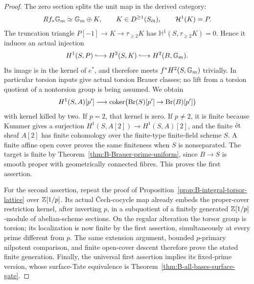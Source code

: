 \begin{proof}
The zero section splits the unit map in the derived category:
\[
       Rf_*{\mathbb G_m}\simeq{\mathbb G_m}\oplus K,
       \qquad K\in D^{\ge1}(S_{\mathrm{\acute et}}),
       \qquad\mathcal H^1(K)=P.
\]
The truncation triangle
\(P[-1]\to K\to\tau_{\ge2}K\) has
\(\mathbb H^1(S,\tau_{\ge2}K)=0\).  Hence it induces
an actual injection
\[
 H^1(S,P)\lhook\joinrel\longrightarrow
 H^2(S,K)\lhook\joinrel\longrightarrow H^2(B,\Gm).
\]
Its image is in the kernel of \(e^*\), and therefore meets
\(f^*H^2(S,{\mathbb G_m})\) trivially.  In particular torsion inputs
give actual torsion Brauer classes; no lift from a torsion
quotient of a nontorsion group is being assumed.  We obtain
\[
 H^1(S,A)[p']\longrightarrow
 \operatorname{coker}\bigl(\operatorname{Br}(S)[p']\to\operatorname{Br}(B)[p']\bigr)
\]
with kernel killed by two.  If \(p=2\), that kernel is zero.
If \(p\ne2\), it is finite because Kummer gives a surjection
\(H^1(S,A[2])\to H^1(S,A)[2]\), and the finite \(\mathrm{\acute et}\)
sheaf \(A[2]\) has finite cohomology over the finite-type
finite-field scheme \(S\).  A finite affine open cover proves
the same finiteness when \(S\) is nonseparated.
The target is finite by
Theorem~\ref{thm:B-Brauer-prime-uniform}, since \(B\to S\)
is smooth proper with geometrically connected fibres.  This
proves the first assertion.

For the second assertion, repeat the proof of
Proposition~\ref{prop:B-integral-torsor-lattice} over
\(\mathbb Z[1/p]\).  Its actual \v Cech-cocycle map already
embeds the proper-cover restriction kernel, after inverting
\(p\), in a subquotient of a finitely generated
\(\mathbb Z[1/p]\)-module of abelian-scheme sections.  On the regular
alteration the torsor group is torsion; its localization is
now finite by the first assertion, simultaneously at every
prime different from \(p\).  The same extension argument,
bounded \(p\)-primary nilpotent comparison, and finite open-cover
descent therefore prove the stated finite generation.
Finally, the universal first assertion implies its fixed-prime
version, whose surface-Tate equivalence is
Theorem~\ref{thm:B-all-bases-surface-gate}.
\end{proof}
